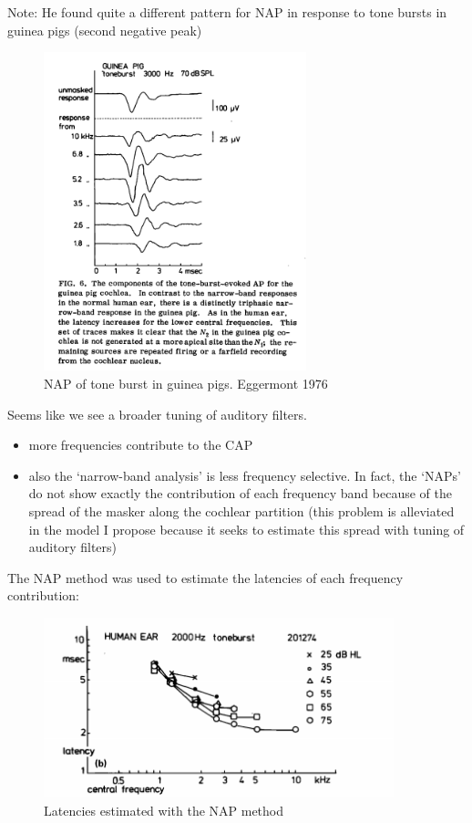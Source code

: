 \documentclass[]{article}
\providecommand{\tightlist}{%
  \setlength{\itemsep}{0pt}\setlength{\parskip}{0pt}}
\begin{document}
\clearpage

Note: He found quite a different pattern for NAP in response to tone
bursts in guinea pigs (second negative peak)

\begin{figure}
\centering
\includegraphics[width=3in,height=\textheight]{./figures/NAP_tone_guinea.png}
\caption{NAP of tone burst in guinea pigs. Eggermont 1976}
\end{figure}

Seems like we see a broader tuning of auditory filters.

\begin{itemize}
\tightlist
\item
  more frequencies contribute to the CAP
\item
  also the `narrow-band analysis' is less frequency selective. In fact,
  the `NAPs' do not show exactly the contribution of each frequency band
  because of the spread of the masker along the cochlear partition (this
  problem is alleviated in the model I propose because it seeks to
  estimate this spread with tuning of auditory filters)
\end{itemize}

\clearpage

The NAP method was used to estimate the latencies of each frequency
contribution:

\begin{figure}
\centering
\includegraphics[width=4in,height=\textheight]{./figures/NAP_tone_latencies.png}
\caption{Latencies estimated with the NAP method}
\end{figure}
\end{document}
